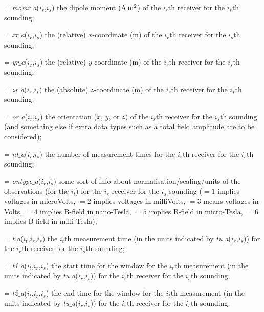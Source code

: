 \medskip
\hangindent=\parindent{}\noindent
{\sl momr$\_$a}($i_r$,$i_s$) the dipole moment (${\rm A\,m^2}$) of the $i_r$th receiver for
the $i_s$th sounding;

\medskip
\hangindent=\parindent{}\noindent
{\sl xr$\_$a}($i_r$,$i_s$) the (relative) $x$-coordinate (m) of the $i_r$th receiver for the
$i_s$th sounding;

\medskip
\hangindent=\parindent{}\noindent
{\sl yr$\_$a}($i_r$,$i_s$) the (relative) $y$-coordinate (m) of the $i_r$th receiver for the
$i_s$th sounding;

\medskip
\hangindent=\parindent{}\noindent
{\sl zr$\_$a}($i_r$,$i_s$) the (absolute) $z$-coordinate (m) of the $i_r$th receiver for the
$i_s$th sounding;

\medskip
\hangindent=\parindent{}\noindent
{\sl or$\_$a}($i_r$,$i_s$) the orientation ($x$, $y$, or $z$) of the $i_r$th receiver for
the $i_s$th sounding (and something else if extra data types such as a total field amplitude
are to be considered);

\medskip
\hangindent=\parindent{}\noindent
{\sl nt$\_$a}($i_r$,$i_s$) the number of measurement times for the $i_r$th receiver for the
$i_s$th sounding;

\medskip
\hangindent=\parindent{}\noindent
{\sl ontype$\_$a}($i_r$,$i_s$) some sort of info about normalisation/scaling/units of the
observations (for the $i_t$) for the $i_r$ receiver for the $i_s$ sounding ($=1$ implies
voltages in microVolts, $=2$ implies voltages in milliVolts, $=3$ means voltages in Volts,
$=4$ implies B-field in nano-Tesla, $=5$ implies B-field in micro-Tesla, $=6$ implies B-field
in milli-Tesla);

\medskip
\hangindent=\parindent{}\noindent
{\sl t$\_$a}($i_t$,$i_r$,$i_s$) the $i_t$th measurement time (in the units indicated by
{\sl tu$\_$a}($i_r$,$i_s$)) for the $i_r$th receiver for the $i_s$th sounding;

\medskip
\hangindent=\parindent{}\noindent
{\sl t1$\_$a}($i_t$,$i_r$,$i_s$) the start time for the window for the $i_t$th measurement (in
the units indicated by {\sl tu$\_$a}($i_r$,$i_s$)) for the $i_r$th receiver for the
$i_s$th sounding;

\medskip
\hangindent=\parindent{}\noindent
{\sl t2$\_$a}($i_t$,$i_r$,$i_s$) the end time for the window for the $i_t$th measurement (in
the units indicated by {\sl tu$\_$a}($i_r$,$i_s$)) for the $i_r$th receiver for the
$i_s$th sounding;


